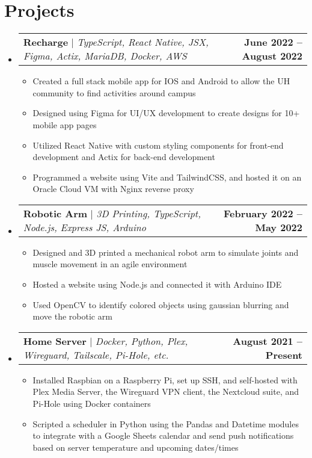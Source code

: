 \documentclass[letterpaper,11pt]{article}
\makeatletter
\newcommand{\resumeItem}[1]{
  \item\small{
    {#1 \vspace{-2pt}}
  }
}
\newcommand{\resumeProjectHeading}[2]{
    \item
    \begin{tabular*}{1.001\textwidth}{l@{\extracolsep{\fill}}r}
      \small#1 & \textbf{\small #2}\\
    \end{tabular*}\vspace{-7pt}
}
\newcommand{\resumeSubHeadingListStart}{\begin{itemize}[leftmargin=0.0in, label={}]}
\newcommand{\resumeSubHeadingListEnd}{\end{itemize}}
\newcommand{\resumeItemListStart}{\begin{itemize}}
\newcommand{\resumeItemListEnd}{\end{itemize}\vspace{-5pt}}
\makeatother
\begin{document}
\section{Projects}
    \vspace{-5pt}
    \resumeSubHeadingListStart
      \resumeProjectHeading
          {\textbf{Recharge} $|$ \emph{TypeScript, React Native, JSX, Figma, Actix, MariaDB, Docker, AWS}}{June 2022 -- August 2022}
          \resumeItemListStart
            \resumeItem{Created a full stack mobile app for IOS and Android to allow the UH community to find activities around campus}
            \resumeItem{Designed using Figma for UI/UX development to create designs for 10+ mobile app pages}
            \resumeItem{Utilized React Native with custom styling components for front-end development and Actix for back-end development}
            \resumeItem{Programmed a website using Vite and TailwindCSS, and hosted it on an Oracle Cloud VM with Nginx reverse proxy}
          \resumeItemListEnd
          \vspace{-13pt}
      \resumeProjectHeading
          {\textbf{Robotic Arm} $|$ \emph{3D Printing, TypeScript, Node.js, Express JS, Arduino}}{February 2022 -- May 2022}
          \resumeItemListStart
            \resumeItem{Designed and 3D printed a mechanical robot arm to simulate joints and muscle movement in an agile environment}
            \resumeItem{Hosted a website using Node.js and connected it with Arduino IDE}
            \resumeItem{Used OpenCV to identify colored objects using gaussian blurring and move the robotic arm}
          \resumeItemListEnd 
          \vspace{-13pt}
          \resumeProjectHeading
          {\textbf{Home Server} $|$ \emph{Docker, Python, Plex, Wireguard, Tailscale, Pi-Hole, etc.}}{August 2021 -- Present}
          \resumeItemListStart
            \resumeItem{Installed Raspbian on a Raspberry Pi, set up SSH, and self-hosted with Plex Media Server, the Wireguard VPN client, the Nextcloud suite, and Pi-Hole using Docker containers}
            \resumeItem{Scripted a scheduler in Python using the Pandas and Datetime modules to integrate with a Google Sheets calendar and send push notifications based on server temperature and upcoming dates/times}
          \resumeItemListEnd 
    \resumeSubHeadingListEnd
\vspace{-15pt}


%
\end{document}
